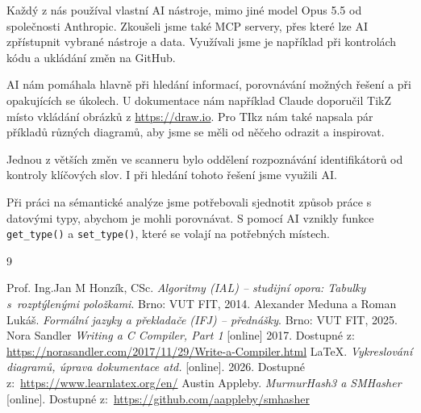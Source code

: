 \documentclass[a4paper,11pt]{article}
\newcommand{\id}[1]{\texttt{#1}}
\begin{document}
Každý z nás používal vlastní AI nástroje, mimo jiné model Opus 5.5 od společnosti Anthropic. Zkoušeli jsme také MCP servery, přes které lze AI zpřístupnit vybrané nástroje a data. Využívali jsme je například při kontrolách kódu a ukládání změn na GitHub.

AI nám pomáhala hlavně při hledání informací, porovnávání možných řešení a při opakujících se úkolech. U dokumentace nám například Claude doporučil TikZ místo vkládání obrázků z \url{https://draw.io}. Pro TIkz nám také napsala pár příkladů různých diagramů, aby jsme se měli od něčeho odrazit a inspirovat.

Jednou z větších změn ve scanneru bylo oddělení rozpoznávání identifikátorů od kontroly klíčových slov. I při hledání tohoto řešení jsme využili AI.

Při práci na sémantické analýze jsme potřebovali sjednotit způsob práce s datovými typy, abychom je mohli porovnávat. S pomocí AI vznikly funkce \id{get\_type()} a \id{set\_type()}, které se volají na potřebných místech.

\renewcommand{\refname}{Literatura}
\begin{thebibliography}{9}
\addcontentsline{toc}{section}{\refname}
    Prof. Ing.Jan M Honzík, CSc. \emph{Algoritmy (IAL) -- studijní opora: Tabulky s~rozptýlenými položkami}.
    Brno: VUT FIT, 2014.
    Alexander Meduna a Roman Lukáš. \emph{Formální jazyky a překladače (IFJ) -- přednášky}. Brno: VUT FIT, 2025.
    Nora Sandler \emph{Writing a C Compiler, Part 1} [online] 2017.
    Dostupné z: \url{https://norasandler.com/2017/11/29/Write-a-Compiler.html}
    LaTeX. \emph{Vykreslování diagramů, úprava dokumentace atd.} [online]. 2026.
    Dostupné z:~\url{https://www.learnlatex.org/en/}
    Austin Appleby. \emph{MurmurHash3 a SMHasher} [online].
    Dostupné z:~\url{https://github.com/aappleby/smhasher}
\end{thebibliography}
\end{document}
